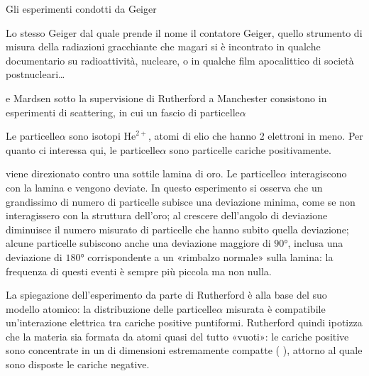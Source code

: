 \documentclass[letterpaper,10pt,italian]{jupyterBook}
\begin{document}
\sphinxAtStartPar
{} Gli esperimenti condotti da Geiger%
\begin{footnote}[1]\sphinxAtStartFootnote
Lo stesso Geiger dal quale prende il nome il contatore Geiger, quello strumento di misura della radiazioni gracchiante che magari si è incontrato in qualche documentario su radioattività, nucleare, o in qualche film apocalittico di società post\sphinxhyphen{}nucleari…
%
\end{footnote} e Mardsen sotto la supervisione di Rutherford a Manchester consistono in esperimenti di scattering, in cui un fascio di particelle\sphinxhyphen{}\(\alpha\)%
\begin{footnote}[2]\sphinxAtStartFootnote
Le particelle\sphinxhyphen{}\(\alpha\) sono isotopi \(\text{He}^{2+}\), atomi di elio che hanno 2 elettroni in meno. Per quanto ci interessa qui, le particelle\sphinxhyphen{}\(\alpha\) sono particelle cariche positivamente.
%
\end{footnote} viene direzionato contro una sottile lamina di oro. Le particelle\sphinxhyphen{}\(\alpha\) interagiscono con la lamina e vengono deviate. In questo esperimento si osserva che un grandissimo di numero di particelle subisce una deviazione minima, come se non interagissero con la struttura dell’oro; al crescere dell’angolo di deviazione diminuisce il numero misurato di particelle che hanno subito quella deviazione; alcune particelle subiscono anche una deviazione maggiore di \(90°\), inclusa una deviazione di \(180°\) corrispondente a un «rimbalzo normale» sulla lamina: la frequenza di questi eventi è sempre più piccola ma non nulla.

\sphinxAtStartPar
La spiegazione dell’esperimento da parte di Rutherford è alla base del suo modello atomico: la distribuzione delle particelle\sphinxhyphen{}\(\alpha\) misurata è compatibile un’interazione elettrica tra cariche positive puntiformi. Rutherford quindi ipotizza che la materia sia formata da atomi quasi del tutto «vuoti»: le cariche positive sono concentrate in un  di dimensioni estremamente compatte ( ), attorno al quale sono disposte le cariche negative.  
\end{document}
